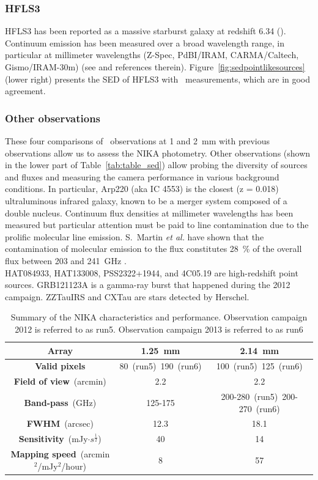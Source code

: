 \subsubsection*{HFLS3}
HFLS3 has been reported as a massive starburst galaxy at redshift 6.34
(\cite{2013Natur.496..329R}).  Continuum emission has been measured over a broad
wavelength range, in particular at millimeter wavelengths (Z-Spec, PdBI/IRAM,
CARMA/Caltech, Gismo/IRAM-30m) (see \cite{2013Natur.496..329R} and references
therein). Figure~\ref{fig:sedpointlikesources} (lower right) presents the SED
of HFLS3 with \NIKA\ measurements, which are in good agreement.


\subsubsection*{Other observations} 
These four comparisons of \NIKA\ observations at 1 and 2~mm with previous
observations allow us to assess the NIKA photometry.  Other observations
(shown in the lower part of Table~\ref{tab:table_sed}) allow probing the
diversity of sources and fluxes and measuring the camera performance in various
background conditions. In particular,  Arp220 (aka IC 4553) is the closest (z = 0.018) ultraluminous
infrared galaxy, known to be a merger system composed of a double nucleus. 
Continuum flux densities at millimeter wavelengths has been measured \citep{Sakamoto, Scoville, woody} 
but particular attention must be paid to line contamination due to the prolific molecular line emission. 
S.~Martin {\it et al.} have shown  that 
the contamination of molecular emission to the flux 
constitutes 28~\% of the overall flux between 203 and
241~GHz  \citep{Martin:2010gg}.\\  
HAT084933, HAT133008, PSS2322+1944, and 4C05.19 are high-redshift
point sources. GRB121123A is a gamma-ray burst that happened during the 2012
campaign. ZZTauIRS and CXTau are stars detected by Herschel.


 \begin{table}[t!]
\begin{center}
\begin{tabular}{ccc}
\hline
\hline
{\bfseries Array} & 1.25~mm & 2.14~mm  \\
\hline \hline
{\bfseries Valid pixels} & 80~(run5)~190~(run6) & 100~(run5)~125~(run6) \\
{\bfseries Field of view}~(arcmin) & 2.2 & 2.2 \\
{\bfseries Band-pass}~(GHz) & 125-175   & 200-280~(run5)~200-270~(run6)  \\
{\bfseries FWHM}~(arcsec) &  12.3  & 18.1 \\
{\bfseries Sensitivity}~(mJy$\cdot s^\frac{1}{2}$) & 40 & 14  \\
{\bfseries Mapping speed}~(arcmin$^2$/mJy$^2$/hour) & 8 & 57  \\
\hline \hline
\end{tabular}
\end{center}
\caption{Summary of the NIKA characteristics and performance. Observation campaign 2012 is referred to as run5. Observation campaign 2013 is referred to as run6}
\label{tab:table_fin}
\end{table}



